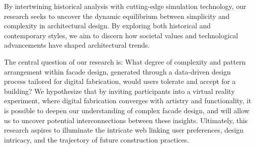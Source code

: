 By intertwining historical analysis with cutting-edge simulation technology, our research seeks to uncover the dynamic equilibrium between simplicity and complexity in architectural design.
By exploring both historical and contemporary styles, we aim to discern how societal values and technological advancements have shaped architectural trends.

The central question of our research is: What degree of complexity and pattern arrangement within facade design, generated through a data-driven design process tailored for digital fabrication, would users tolerate and accept for a building?
We hypothesize that by inviting participants into a virtual reality experiment, where digital fabrication converges with artistry and functionality, it is possible to deepen our understanding of complex facade design, and will allow us to uncover potential interconnections between these insights.
Ultimately, this research aspires to illuminate the intricate web linking user preferences, design intricacy, and the trajectory of future construction practices.







